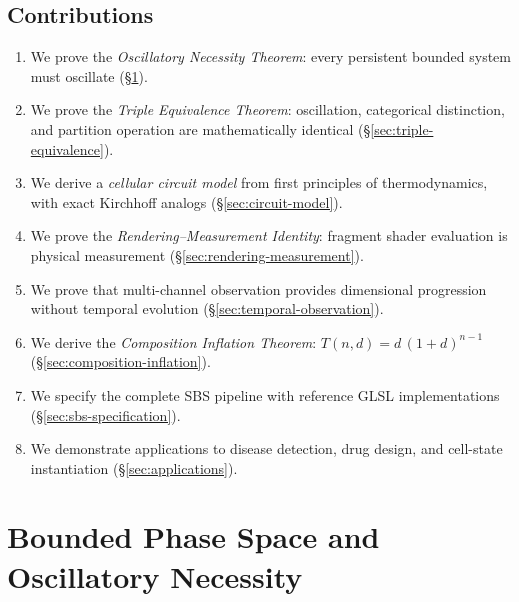 \documentclass[11pt,twocolumn,a4paper]{article}
\begin{document}
\subsection{Contributions}

\begin{enumerate}[leftmargin=*,itemsep=2pt]
\item We prove the \emph{Oscillatory Necessity Theorem}: every
  persistent bounded system must oscillate
  (\S\ref{sec:oscillatory-necessity}).

\item We prove the \emph{Triple Equivalence Theorem}: oscillation,
  categorical distinction, and partition operation are mathematically
  identical (\S\ref{sec:triple-equivalence}).

\item We derive a \emph{cellular circuit model} from first principles
  of thermodynamics, with exact Kirchhoff analogs
  (\S\ref{sec:circuit-model}).

\item We prove the \emph{Rendering--Measurement Identity}: fragment
  shader evaluation is physical measurement
  (\S\ref{sec:rendering-measurement}).

\item We prove that multi-channel observation provides dimensional
  progression without temporal evolution
  (\S\ref{sec:temporal-observation}).

\item We derive the \emph{Composition Inflation Theorem}:
  $T(n,d) = d\,(1+d)^{n-1}$ (\S\ref{sec:composition-inflation}).

\item We specify the complete SBS pipeline with reference GLSL
  implementations (\S\ref{sec:sbs-specification}).

\item We demonstrate applications to disease detection, drug design,
  and cell-state instantiation (\S\ref{sec:applications}).
\end{enumerate}



\section{Bounded Phase Space and Oscillatory Necessity}
\label{sec:oscillatory-necessity}
\end{document}
